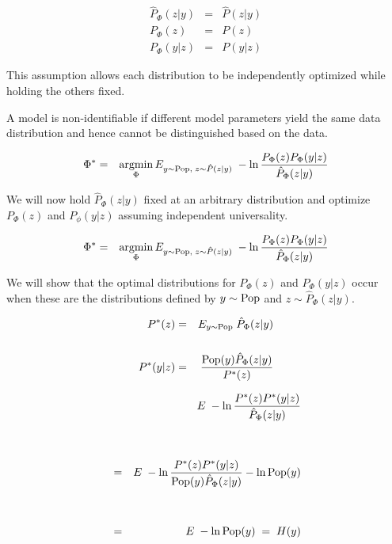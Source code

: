 {\begin{eqnarray*}
\hat{P}_\Phi(z|y) & = & \hat{P}(z|y) \\
P_\Phi(z) & = & P(z) \\
P_\Phi(y|z) & = & P(y|z)
\end{eqnarray*}

\vfill
This assumption allows each distribution to be independently optimized while holding the others fixed.



A model is non-identifiable if different model parameters yield the same data distribution and hence cannot be distinguished based on the data.

\begin{eqnarray*}
  \Phi^* & = & \operatorname*{argmin}_\Phi E_{y\sim \mathrm{Pop},\;z \sim \hat{P}(z|y)}\;-\ln \frac{P_\Phi(z)P_\Phi(y|z)}{\hat{P}_\Phi(z|y)}
\end{eqnarray*}

\vfill
We will now hold $\hat{P}_\Phi(z|y)$ fixed at an arbitrary distribution and optimize $P_\Phi(z)$ and $P_\phi(y|z)$ assuming independent
universality.


\begin{eqnarray*}
  \Phi^* & = & \operatorname*{argmin}_\Phi E_{y\sim \mathrm{Pop},\;z \sim \hat{P}(z|y)}\;-\ln \frac{P_\Phi(z)P_\Phi(y|z)}{\hat{P}_\Phi(z|y)}
\end{eqnarray*}

\vfill
We will show that the optimal distributions for $P_\Phi(z)$ and $P_\Phi(y|z)$ occur when these are the distributions defined by
$y \sim \mathrm{Pop}$ and $z \sim \hat{P}_\Phi(z|y)$.

\vfill
\begin{eqnarray*}
  P^*(z) & = & E_{y \sim \mathrm{Pop}}\;\hat{P}_\Phi(z|y) \\
  \\
  P^*(y|z) & = & \frac{\mathrm{Pop}(y)\hat{P}_\Phi(z|y)}{P^*(z)}
\end{eqnarray*}



\begin{eqnarray*}
  & & E\;-\ln \frac{P^*(z)P^*(y|z)}{\hat{P}_\Phi(z|y)} \\
  \\
  \\
  & = & E\;-\ln \frac{P^*(z)P^*(y|z)}{\mathrm{Pop}(y)\hat{P}_\Phi(z|y)} - \ln \mathrm{Pop}(y) \\
  \\
  \\
    & = & E\;- \ln \mathrm{Pop}(y) \;=\;H(y)
\end{eqnarray*}

}

